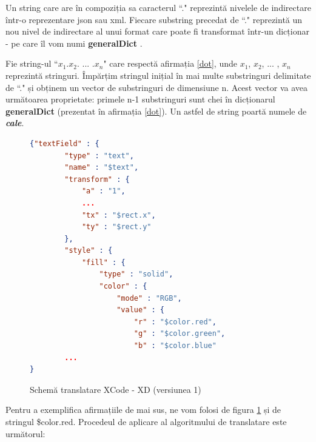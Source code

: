 \begin{mydef}\label{dot}
Un string care are în compoziția sa caracterul ``." reprezintă nivelele de indirectare într-o reprezentare json sau xml. Fiecare substring precedat de ``." reprezintă un nou nivel de indirectare al unui format care poate fi transformat într-un dicționar - pe care îl vom numi \textbf{generalDict} .\\
\end{mydef}


\begin{mydef}\label{count}
Fie string-ul ``$x_1$.$x_2$. ... .$x_n$" care respectă afirmația \ref{dot}, unde $x_1$, $x_2$, ... , $x_n$ reprezintă stringuri. Împărțim stringul inițial în mai multe substringuri delimitate de ``." și obținem un vector de substringuri de dimensiune n. Acest vector va avea următoarea proprietate: primele n-1 substringuri sunt chei în dicționarul \textbf{generalDict} (prezentat în afirmația \ref{dot}). Un astfel de string poartă numele de \textbf{\textit{cale}}. \\
\end{mydef}


\begin{figure}[!htbp]
\begin{lstlisting}[language=json,firstnumber=1]
{"textField" : {
        "type" : "text",
        "name" : "$text",
        "transform" : {
            "a" : "1",
            ...
            "tx" : "$rect.x",
            "ty" : "$rect.y"
        },
        "style" : {
            "fill" : {
                "type" : "solid",
                "color" : {
                    "mode" : "RGB",
                    "value" : {
                        "r" : "$color.red",
                        "g" : "$color.green",
                        "b" : "$color.blue"
        ...
}

\end{lstlisting}
\caption{Schemă translatare XCode - XD (versiunea 1)} \label{fig:XCode2XD Schema}
\end{figure}

Pentru a exemplifica afirmațiile de mai sus, ne vom folosi de figura \ref{fig:XCode2XD Schema} și de stringul \$color.red. Procedeul de aplicare al algoritmului de translatare este următorul:

